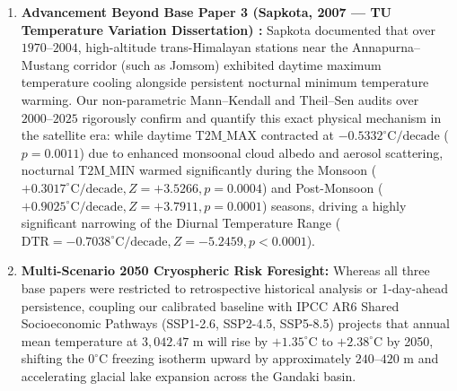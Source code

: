 \documentclass[conference]{IEEEtran}
\begin{document}
\begin{enumerate}
    \item \textbf{Advancement Beyond Base Paper 3 (Sapkota, 2007 --- TU Temperature Variation Dissertation) \cite{sapkota2007}:} Sapkota documented that over $1970\text{--}2004$, high-altitude trans-Himalayan stations near the Annapurna--Mustang corridor (such as Jomsom) exhibited daytime maximum temperature cooling alongside persistent nocturnal minimum temperature warming. Our non-parametric Mann--Kendall and Theil--Sen audits over $2000\text{--}2025$ rigorously confirm and quantify this exact physical mechanism in the satellite era: while daytime $\text{T2M\_MAX}$ contracted at $-0.5332^\circ\text{C/decade}$ ($p = 0.0011$) due to enhanced monsoonal cloud albedo and aerosol scattering, nocturnal $\text{T2M\_MIN}$ warmed significantly during the Monsoon ($+0.3017^\circ\text{C/decade}, Z = +3.5266, p = 0.0004$) and Post-Monsoon ($+0.9025^\circ\text{C/decade}, Z = +3.7911, p = 0.0001$) seasons, driving a highly significant narrowing of the Diurnal Temperature Range ($\text{DTR} = -0.7038^\circ\text{C/decade}, Z = -5.2459, p < 0.0001$).
    
    \item \textbf{Multi-Scenario 2050 Cryospheric Risk Foresight:} Whereas all three base papers were restricted to retrospective historical analysis or 1-day-ahead persistence, coupling our calibrated baseline with IPCC AR6 Shared Socioeconomic Pathways (SSP1-2.6, SSP2-4.5, SSP5-8.5) projects that annual mean temperature at $3,042.47\text{ m}$ will rise by $+1.35^\circ\text{C}$ to $+2.38^\circ\text{C}$ by 2050, shifting the $0^\circ\text{C}$ freezing isotherm upward by approximately $240\text{--}420\text{ m}$ and accelerating glacial lake expansion across the Gandaki basin.
\end{enumerate}
\end{document}
